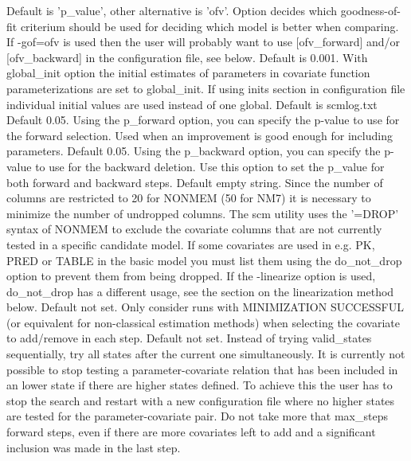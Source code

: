 \begin{optionlist}
Default is 'p\_value', other alternative is 'ofv'. Option decides which goodness-of-fit criterium should be used for deciding which model is better when comparing. 
If -gof=ofv is used then the user will probably want to use [ofv\_forward] and/or [ofv\_backward] in the configuration file, see below.
\nextopt
{}
Default is 0.001. With global\_init option the initial estimates of parameters in covariate function parameterizations are set to global\_init. If using inits section in configuration file individual initial values are used instead of one global. 
\nextopt
{}
Default is scmlog.txt 
\nextopt
{}
Default 0.05. Using the p\_forward option, you can specify the p-value to use for the forward selection. Used when an improvement is good enough for including parameters. 
\nextopt
{}
Default 0.05. Using the p\_backward option, you can specify the p-value to use for the backward deletion. 
\nextopt
{}
Use this option to set the p\_value for both forward and backward steps. 
\nextopt
{}
Default empty string. Since the number of columns are restricted to 20 for NONMEM (50 for NM7) it is necessary to minimize the number of undropped columns. The scm utility uses the '=DROP' syntax of NONMEM to exclude the covariate columns that are not currently tested in a specific candidate model. If some covariates are used in e.g. PK, PRED or TABLE in the basic model you must list them using the do\_not\_drop option to prevent them from being dropped. If the -linearize option is used, do\_not\_drop has a different usage, see the section on the linearization method below. 
\nextopt
{}
Default not set. Only consider runs with MINIMIZATION SUCCESSFUL (or equivalent for non-classical estimation methods) when selecting the covariate to add/remove in each step. 
\nextopt
{}
Default not set. Instead of trying valid\_states sequentially, try all states after the current one simultaneously. It is currently not possible to stop testing a parameter-covariate relation that has been included in an lower state if there are higher states defined. To achieve this the user has to stop the search and restart with a new configuration file where no higher states are tested for the parameter-covariate pair. 
\nextopt
{}
Do not take more that max\_steps forward steps, even if there are more covariates left to add and a significant inclusion was made in the last step. 
\nextopt
\end{optionlist}


